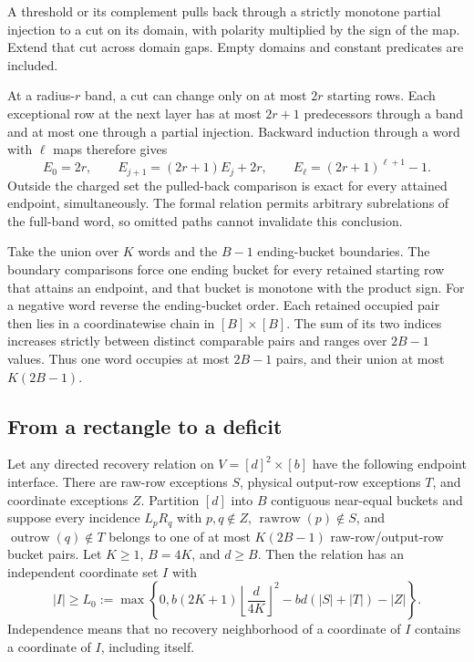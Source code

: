 \begin{outline}
A threshold or its complement pulls back through a strictly monotone
partial injection to a cut on its domain, with polarity multiplied by
the sign of the map. Extend that cut across domain gaps. Empty domains
and constant predicates are included.

At a radius-$r$ band, a cut can change only on at most $2r$ starting
rows. Each exceptional row at the next layer has at most $2r+1$
predecessors through a band and at most one through a partial injection.
Backward induction through a word with $\ell$ maps therefore gives
\[
 E_0=2r,\qquad E_{j+1}=(2r+1)E_j+2r,\qquad
 E_\ell=(2r+1)^{\ell+1}-1.
\]
Outside the charged set the pulled-back comparison is exact for every
attained endpoint, simultaneously. The formal relation permits arbitrary
subrelations of the full-band word, so omitted paths cannot invalidate
this conclusion.

Take the union over $K$ words and the $B-1$ ending-bucket boundaries.
The boundary comparisons force one ending bucket for every retained
starting row that attains an endpoint, and that bucket is monotone with
the product sign. For a negative word reverse the ending-bucket order.
Each retained occupied pair then lies in a coordinatewise chain in
$[B]\times[B]$. The sum of its two indices increases strictly between
distinct comparable pairs and ranges over $2B-1$ values. Thus one word
occupies at most $2B-1$ pairs, and their union at most $K(2B-1)$.
\end{outline}


\subsection{From a rectangle to a deficit}

\begin{lemma}\label{lem:cd-rectangle}
Let any directed recovery relation on $V=[d]^2\times[b]$ have the
following endpoint interface.  There are raw-row exceptions $S$, physical
output-row exceptions $T$, and coordinate exceptions $Z$.  Partition
$[d]$ into $B$ contiguous near-equal buckets and suppose every incidence
$L_pR_q$ with $p,q\notin Z$, $\operatorname{rawrow}(p)\notin S$, and
$\operatorname{outrow}(q)\notin T$ belongs to one of at most
$K(2B-1)$ raw-row/output-row bucket pairs.  Let $K\ge1$, $B=4K$, and $d\ge B$.
Then the relation has an independent coordinate set $I$ with
\[
 |I|\ge L_0:=\max\left\{0,
 b(2K+1)\left\lfloor\frac d{4K}\right\rfloor^2
       -bd(|S|+|T|)-|Z|\right\}.
\]
Independence means that no recovery neighborhood of a coordinate of $I$
contains a coordinate of $I$, including itself.
\end{lemma}

